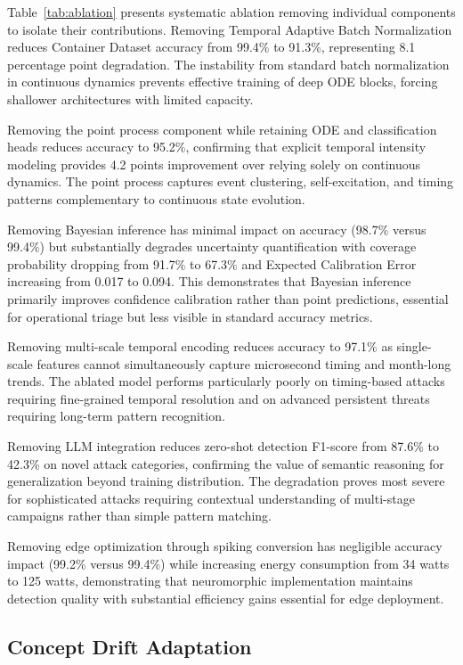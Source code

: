 \documentclass[10pt,journal,compsoc]{IEEEtran}
\begin{document}
Table~\ref{tab:ablation} presents systematic ablation removing individual components to isolate their contributions. Removing Temporal Adaptive Batch Normalization reduces Container Dataset accuracy from 99.4\% to 91.3\%, representing 8.1 percentage point degradation. The instability from standard batch normalization in continuous dynamics prevents effective training of deep ODE blocks, forcing shallower architectures with limited capacity.

Removing the point process component while retaining ODE and classification heads reduces accuracy to 95.2\%, confirming that explicit temporal intensity modeling provides 4.2 points improvement over relying solely on continuous dynamics. The point process captures event clustering, self-excitation, and timing patterns complementary to continuous state evolution.

Removing Bayesian inference has minimal impact on accuracy (98.7\% versus 99.4\%) but substantially degrades uncertainty quantification with coverage probability dropping from 91.7\% to 67.3\% and Expected Calibration Error increasing from 0.017 to 0.094. This demonstrates that Bayesian inference primarily improves confidence calibration rather than point predictions, essential for operational triage but less visible in standard accuracy metrics.

Removing multi-scale temporal encoding reduces accuracy to 97.1\% as single-scale features cannot simultaneously capture microsecond timing and month-long trends. The ablated model performs particularly poorly on timing-based attacks requiring fine-grained temporal resolution and on advanced persistent threats requiring long-term pattern recognition.

Removing LLM integration reduces zero-shot detection F1-score from 87.6\% to 42.3\% on novel attack categories, confirming the value of semantic reasoning for generalization beyond training distribution. The degradation proves most severe for sophisticated attacks requiring contextual understanding of multi-stage campaigns rather than simple pattern matching.

Removing edge optimization through spiking conversion has negligible accuracy impact (99.2\% versus 99.4\%) while increasing energy consumption from 34 watts to 125 watts, demonstrating that neuromorphic implementation maintains detection quality with substantial efficiency gains essential for edge deployment.

\subsection{Concept Drift Adaptation}
\end{document}
